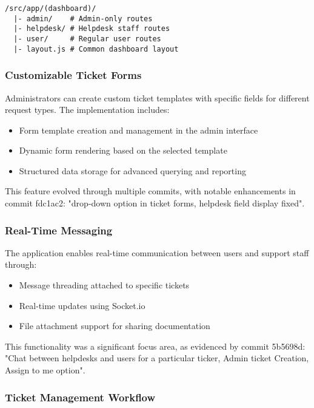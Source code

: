 \documentclass[12pt,a4paper]{article}
\begin{document}
\begin{lstlisting}[caption=Dashboard Directory Structure]
/src/app/(dashboard)/
  |- admin/    # Admin-only routes
  |- helpdesk/ # Helpdesk staff routes
  |- user/     # Regular user routes
  |- layout.js # Common dashboard layout
\end{lstlisting}

\subsubsection{Customizable Ticket Forms}

Administrators can create custom ticket templates with specific fields for different request types. The implementation includes:

\begin{itemize}
    \item Form template creation and management in the admin interface
    \item Dynamic form rendering based on the selected template
    \item Structured data storage for advanced querying and reporting
\end{itemize}

This feature evolved through multiple commits, with notable enhancements in commit fdc1ac2: "drop-down option in ticket forms, helpdesk field display fixed".

\subsubsection{Real-Time Messaging}

The application enables real-time communication between users and support staff through:

\begin{itemize}
    \item Message threading attached to specific tickets
    \item Real-time updates using Socket.io
    \item File attachment support for sharing documentation
\end{itemize}

This functionality was a significant focus area, as evidenced by commit 5b5698d: "Chat between helpdesks and users for a particular ticker, Admin ticket Creation, Assign to me option".

\subsubsection{Ticket Management Workflow}
\end{document}
